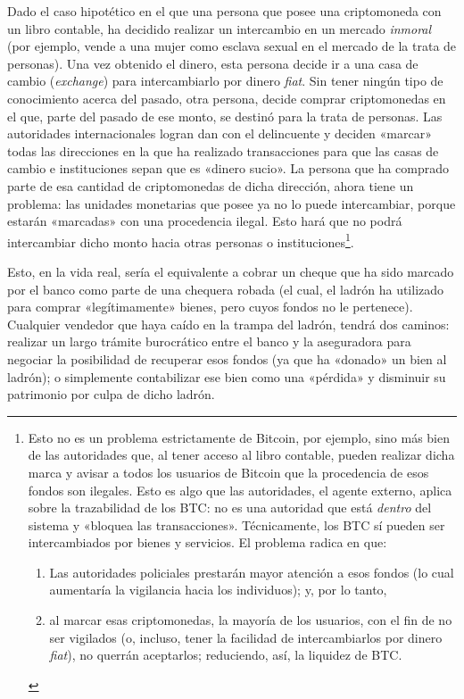 \documentclass[12pt,a4paper,twoside]{book}
\begin{document}
Dado el caso hipotético en el que una persona que posee una criptomoneda con un libro contable, ha decidido realizar un intercambio en un mercado \textit{inmoral} (por ejemplo, vende a una mujer como esclava sexual en el mercado de la trata de personas). Una vez obtenido el dinero, esta persona decide ir a una casa de cambio (\textit{exchange}) para intercambiarlo por dinero \textit{fiat}. Sin tener ningún tipo de conocimiento acerca del pasado, otra persona, decide comprar criptomonedas en el que, parte del pasado de ese monto, se destinó para la trata de personas. Las autoridades internacionales logran dan con el delincuente y deciden «marcar» todas las direcciones en la que ha realizado transacciones para que las casas de cambio e instituciones sepan que es «dinero sucio». La persona que ha comprado parte de esa cantidad de criptomonedas de dicha dirección, ahora tiene un problema: las unidades monetarias que posee ya no lo puede intercambiar, porque estarán «marcadas» con una procedencia ilegal. Esto hará que no podrá intercambiar dicho monto hacia otras personas o instituciones\footnote{Esto no es un problema estrictamente de Bitcoin, por ejemplo, sino más bien de las autoridades que, al tener acceso al libro contable, pueden realizar dicha marca y avisar a todos los usuarios de Bitcoin que la procedencia de esos fondos son ilegales. Esto es algo que las autoridades, el agente externo, aplica sobre la trazabilidad de los BTC: no es una autoridad que está \textit{dentro} del sistema y «bloquea las transacciones». Técnicamente, los BTC sí pueden ser intercambiados por bienes y servicios. El problema radica en que: 

\begin{enumerate}
\item Las autoridades policiales prestarán mayor atención a esos fondos (lo cual aumentaría la vigilancia hacia los individuos); y, por lo tanto,
\item al marcar esas criptomonedas, la mayoría de los usuarios, con el fin de no ser vigilados (o, incluso, tener la facilidad de intercambiarlos por dinero \textit{fiat}), no querrán aceptarlos; reduciendo, así, la liquidez de BTC.
\end{enumerate}

}.

Esto, en la vida real, sería el equivalente a cobrar un cheque que ha sido marcado por el banco como parte de una chequera robada (el cual, el ladrón ha utilizado para comprar «legítimamente» bienes, pero cuyos fondos no le pertenece). Cualquier vendedor que haya caído en la trampa del ladrón, tendrá dos caminos: realizar un largo trámite burocrático entre el banco y la aseguradora para negociar la posibilidad de recuperar esos fondos (ya que ha «donado» un bien al ladrón); o simplemente contabilizar ese bien como una «pérdida» y disminuir su patrimonio por culpa de dicho ladrón.
\end{document}
